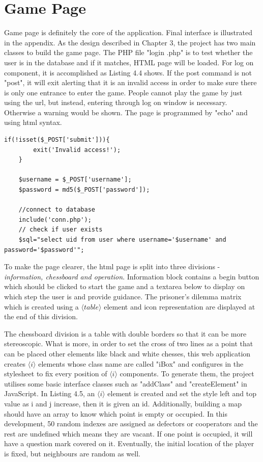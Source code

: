 \section{Game Page}
Game page is definitely the core of the application. Final interface is illustrated in the appendix. As the design described in Chapter 3, the project has two main classes to build the game page. The PHP file "login .php" is to test whether the user is in the database and if it matches, HTML page will be loaded. For log on component, it is accomplished as Listing 4.4 shows. If the post command is not "post", it will exit alerting that it is an invalid access in order to make sure there is only one entrance to enter the game. People cannot play the game by just using the url, but instead, entering through log on window is necessary. Otherwise a warning would be shown. The page is programmed by "echo" and using html syntax. 
\begin{lstlisting}[caption=Code of log on component]
if(!isset($_POST['submit'])){
        exit('Invalid access!');
    }
    
    $username = $_POST['username'];
    $password = md5($_POST['password']);

    //connect to database
    include('conn.php');
    // check if user exists
    $sql="select uid from user where username='$username' and password='$password'";

\end{lstlisting}

To make the page clearer, the html page is split into three divisions - \textit{information, chessboard and operation}. Information block contains a begin button which should be clicked to start the game and a textarea below to display on which step the user is and provide guidance. The prisoner's dilemma matrix which is created using a $\langle table \rangle$ element and icon representation are displayed at the end of this division. 

The chessboard division is a table with double borders so that it can be more stereoscopic. What is more, in order to set the cross of two lines as a point that can be placed other elements  like black and white chesses, this web application creates $\langle i \rangle$ elements whose class name are called "iBox" and configures in the stylesheet to fix every position of $\langle i \rangle$ components. To generate them, the project utilises some basic interface classes such as "addClass" and "createElement" in JavaScript. In Listing 4.5, an $\langle i \rangle$ element is created and set the style left and top value as i and j increase, then it is given an id. Additionally, building a map should have an array to know which point is empty or occupied. In this development, 50 random indexes are assigned as defectors or cooperators and the rest are undefined which means they are vacant. If one point is occupied, it will have a question mark covered on it. Eventually, the initial location of the player is fixed, but neighbours are random as well.

